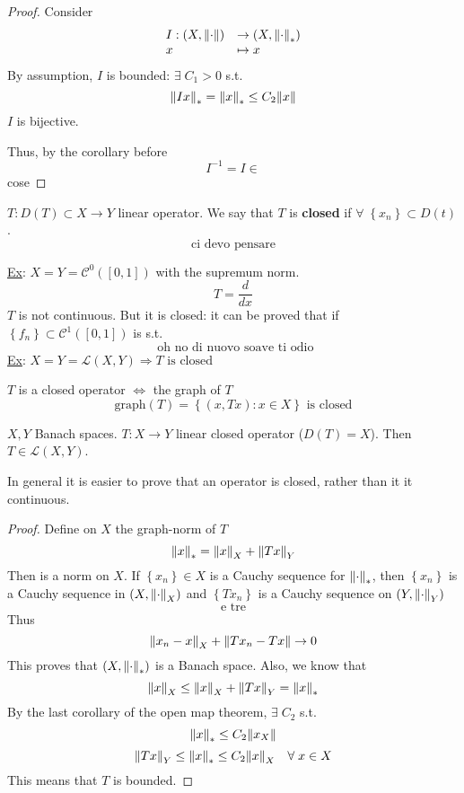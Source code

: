 \begin{proof}
    Consider
    \[
        \begin{array}{ll}
            I : (X, \norm{\cdot}) & \to (X, \norm{\cdot}_*) \\
            x & \mapsto x
        \end{array}
    \]
    By assumption, \(I\) is bounded: \(\exists \; C_1 > 0\) s.t. 
    \[
        \norm{Ix}_* = \norm{x}_* \leq C_2 \norm{x}
    \]
    \(I\) is bijective.

    Thus, by the corollary before
    \[
        I^{-1} = I \in 
    \]
    cose
\end{proof}
\begin{definition}
    \(T : D(T) \subset X \to Y\) linear operator. We say that \(T\) is \textbf{closed} if \(\forall \; \left\{ x_n \right\} \subset D(t)\). 
    \[
        \mbox{ ci devo pensare }
    \]

\end{definition}
\underline{Ex}: \(X = Y = \mathcal{C}^0([0,1])\) with the supremum norm.
\[
    T = \frac{d}{dx}
\]
\(T\) is not continuous. But it is closed: it can be proved that if \(\left\{ f_n \right\} \subset \mathcal{C}^1([0,1])\) is s.t.
\[
    \mbox{ oh no di nuovo soave ti odio}
\] 
\underline{Ex}: \(X = Y = \mathcal{L}(X,Y) \Rightarrow T \mbox{ is closed}\)
\begin{remark}
    \(T\) is a closed operator \(\Leftrightarrow\) the graph of \(T\)
    \[
        \mbox{graph}(T) = \left\{ (x, Tx): x \in X \right\} \mbox{ is closed}
    \]
\end{remark}
\begin{theorem}
    \(X, Y\) Banach spaces. \(T : X \to Y\) linear closed operator (\(D(T) = X\)). Then \(T \in \mathcal{L}(X,Y)\).
\end{theorem}
\begin{remark}
    In general it is easier to prove that an operator is closed, rather than it it continuous.
\end{remark}
\begin{proof}
    Define on \(X\) the graph-norm of \(T\)
    \[
        \norm{x}_* = \norm{x}_X + \norm{Tx}_Y
    \]
    Then is a norm on \(X\). If \(\left\{ x_n \right\} \in X\) is a Cauchy sequence for \(\norm{\cdot}_*\), then \(\left\{ x_n \right\}\) is a Cauchy sequence in \((X, \norm{\cdot}_X)\) and \(\left\{ Tx_n \right\}\) is a Cauchy sequence on \((Y, \norm{\cdot}_Y)\)
    \[
        \mbox{ e tre }
    \]
    Thus 
    \[
        \norm{x_n - x}_X + \norm{Tx_n - Tx} \to 0
    \]
    This proves that \((X, \norm{\cdot}_*)\) is a Banach space. Also, we know that 
    \[
        \norm{x}_X \leq \norm{x}_X + \norm{Tx}_Y = \norm{x}_*
    \]
    By the last corollary of the open map theorem, \(\exists \; C_2\) s.t. 
    \[
        \norm{x}_* \leq C_2 \norm{x_X}
    \]
    \[
        \norm{Tx}_Y \leq \norm{x}_* \leq C_2 \norm{x}_X \quad \forall \; x \in X
    \]
    This means that \(T\) is bounded.
\end{proof}
